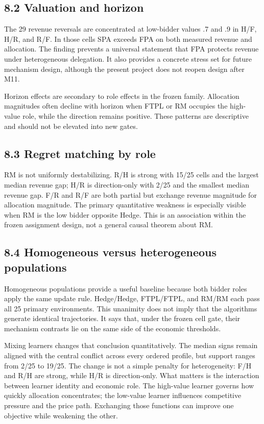 \documentclass[11pt]{article}
\begin{document}
\subsection{8.2 Valuation and horizon}
The 29 revenue reversals are concentrated at low-bidder values .7 and .9 in H/F, H/R, and R/F. In those cells SPA exceeds FPA on both measured revenue and allocation. The finding prevents a universal statement that FPA protects revenue under heterogeneous delegation. It also provides a concrete stress set for future mechanism design, although the present project does not reopen design after M11.

Horizon effects are secondary to role effects in the frozen family. Allocation magnitudes often decline with horizon when FTPL or RM occupies the high-value role, while the direction remains positive. These patterns are descriptive and should not be elevated into new gates.

\subsection{8.3 Regret matching by role}
RM is not uniformly destabilizing. R/H is strong with 15/25 cells and the largest median revenue gap; H/R is direction-only with 2/25 and the smallest median revenue gap. F/R and R/F are both partial but exchange revenue magnitude for allocation magnitude. The primary quantitative weakness is especially visible when RM is the low bidder opposite Hedge. This is an association within the frozen assignment design, not a general causal theorem about RM.

\subsection{8.4 Homogeneous versus heterogeneous populations}
Homogeneous populations provide a useful baseline because both bidder roles apply the same update rule. Hedge/Hedge, FTPL/FTPL, and RM/RM each pass all 25 primary environments. This unanimity does not imply that the algorithms generate identical trajectories. It says that, under the frozen cell gate, their mechanism contrasts lie on the same side of the economic thresholds.

Mixing learners changes that conclusion quantitatively. The median signs remain aligned with the central conflict across every ordered profile, but support ranges from 2/25 to 19/25. The change is not a simple penalty for heterogeneity: F/H and R/H are strong, while H/R is direction-only. What matters is the interaction between learner identity and economic role. The high-value learner governs how quickly allocation concentrates; the low-value learner influences competitive pressure and the price path. Exchanging those functions can improve one objective while weakening the other.
\end{document}
